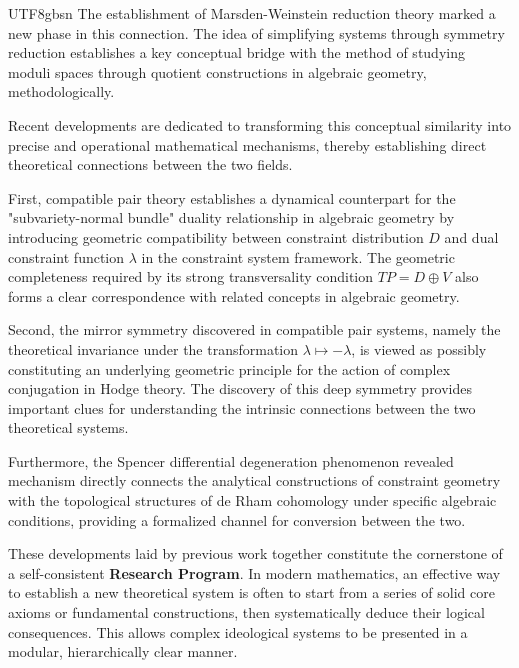 \documentclass[a4paper,12pt]{extarticle}
\theoremstyle{definition}
\begin{document}
\begin{CJK}{UTF8}{gbsn}
The establishment of Marsden-Weinstein reduction theory\cite{marsden1974reduction} marked a new phase in this connection. The idea of simplifying systems through symmetry reduction establishes a key conceptual bridge with the method of studying moduli spaces through quotient constructions in algebraic geometry, methodologically.

Recent developments are dedicated to transforming this conceptual similarity into precise and operational mathematical mechanisms, thereby establishing direct theoretical connections between the two fields.

First, compatible pair theory\cite{zheng2025dynamical} establishes a dynamical counterpart for the "subvariety-normal bundle" duality relationship in algebraic geometry by introducing geometric compatibility between constraint distribution $D$ and dual constraint function $\lambda$ in the constraint system framework. The geometric completeness required by its strong transversality condition $TP = D \oplus V$ also forms a clear correspondence with related concepts in algebraic geometry.

Second, the mirror symmetry discovered in compatible pair systems\cite{zheng2025mirror}, namely the theoretical invariance under the transformation $\lambda \mapsto -\lambda$, is viewed as possibly constituting an underlying geometric principle for the action of complex conjugation in Hodge theory. The discovery of this deep symmetry provides important clues for understanding the intrinsic connections between the two theoretical systems.

Furthermore, the Spencer differential degeneration phenomenon\cite{zheng2025spencerdifferentialdegenerationtheory} revealed mechanism directly connects the analytical constructions of constraint geometry with the topological structures of de Rham cohomology under specific algebraic conditions, providing a formalized channel for conversion between the two.

These developments laid by previous work\cite{zheng2025dynamical, zheng2025mirror, zheng2025spencerdifferentialdegenerationtheory} together constitute the cornerstone of a self-consistent \textbf{Research Program}. In modern mathematics, an effective way to establish a new theoretical system is often to start from a series of solid core axioms or fundamental constructions, then systematically deduce their logical consequences. This allows complex ideological systems to be presented in a modular, hierarchically clear manner.


\end{CJK}
\end{document}
